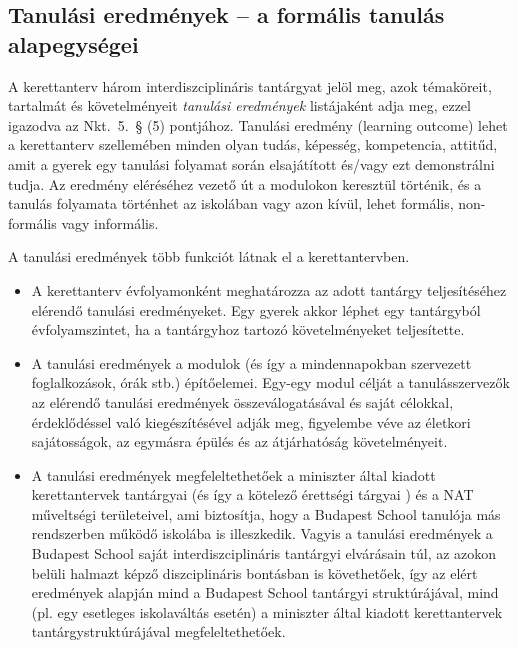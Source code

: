 \subsection{Tanulási eredmények -- a formális tanulás alapegységei}
\label{sec:tanulasi_eredmenyek}
A kerettanterv három interdiszciplináris tantárgyat jelöl meg, azok témaköreit, tartalmát és követelményeit \emph{tanulási eredmények} listájaként adja meg, ezzel igazodva az Nkt.~5.~§ (5) pontjához. Tanulási eredmény (learning outcome) lehet a kerettanterv szellemében minden olyan tudás, képesség, kompetencia, attitűd, amit a gyerek egy tanulási folyamat során elsajátított és/vagy ezt demonstrálni tudja. Az eredmény eléréséhez vezető út a modulokon keresztül történik, és a tanulás folyamata történhet az iskolában vagy azon kívül, lehet formális, non-formális vagy informális.

A tanulási eredmények több funkciót látnak el a kerettantervben.

\begin{itemize}

      \item A kerettanterv évfolyamonként meghatározza az adott tantárgy teljesítéséhez elérendő tanulási eredményeket. Egy gyerek akkor  léphet egy tantárgyból évfolyamszintet, ha a tantárgyhoz tartozó követelményeket teljesítette.

      \item A tanulási eredmények a modulok (és így a mindennapokban szervezett foglalkozások, órák stb.) építőelemei. Egy-egy modul célját a  tanulásszervezők az elérendő tanulási eredmények	összeválogatásával és saját célokkal, érdeklődéssel való	kiegészítésével adják meg, figyelembe véve az életkori  sajátosságok, az egymásra épülés és az átjárhatóság  követelményeit.
      \item A tanulási eredmények megfeleltethetőek a miniszter által kiadott kerettantervek tantárgyai (és így a kötelező érettségi tárgyai )  és a NAT műveltségi területeivel, ami biztosítja, hogy a Budapest  School tanulója más rendszerben működő iskolába is illeszkedik.  Vagyis a tanulási eredmények a Budapest School saját interdiszciplináris tantárgyi elvárásain túl, az azokon belüli halmazt képző diszciplináris bontásban is követhetőek, így az	elért eredmények alapján mind a Budapest School tantárgyi  struktúrájával, mind (pl. egy esetleges iskolaváltás esetén) a	miniszter által kiadott kerettantervek tantárgystruktúrájával megfeleltethetőek.
\end{itemize}

